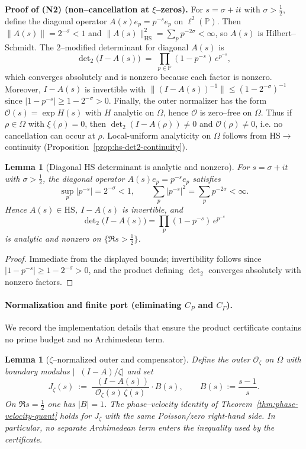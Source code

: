 \documentclass[11pt]{article}
\newtheorem{lemma}[theorem]{Lemma}
\theoremstyle{definition}
\theoremstyle{remark}
\DeclareMathOperator{\dettwo}{det_2}
\begin{document}
\medskip
\noindent\textbf{Proof of (N2) (non--cancellation at $\xi$--zeros).}
For $s=\sigma+it$ with $\sigma>\tfrac12$, define the diagonal operator $A(s)e_p=p^{-s}e_p$ on $\ell^2(\mathbb P)$. Then $\|A(s)\|=2^{-\sigma}<1$ and $\|A(s)\|_{\mathrm{HS}}^2=\sum_{p}p^{-2\sigma}<\infty$, so $A(s)$ is Hilbert--Schmidt. The 2--modified determinant for diagonal $A(s)$ is
\[
\det\nolimits_2\!\big(I-A(s)\big)\;=\;\prod_{p\in\mathbb P}(1-p^{-s})\,e^{p^{-s}},
\]
which converges absolutely and is nonzero because each factor is nonzero. Moreover, $I-A(s)$ is invertible with $\|(I-A(s))^{-1}\|\le (1-2^{-\sigma})^{-1}$ since $|1-p^{-s}|\ge 1-2^{-\sigma}>0$. Finally, the outer normalizer has the form $\mathcal O(s)=\exp H(s)$ with $H$ analytic on $\Omega$, hence $\mathcal O$ is zero--free on $\Omega$. Thus if $\rho\in\Omega$ with $\xi(\rho)=0$, then $\det_2(I-A(\rho))\neq0$ and $\mathcal O(\rho)\neq0$, i.e. no cancellation can occur at $\rho$. Local-uniform analyticity on $\Omega$ follows from HS$\to\dettwo$ continuity (Proposition~\ref{prop:hs-det2-continuity}).
\begin{lemma}[Diagonal HS determinant is analytic and nonzero]\label{lem:hs-diagonal}
For $s=\sigma+it$ with $\sigma>\tfrac12$, the diagonal operator $A(s)e_p=p^{-s}e_p$ satisfies
\[
\sup_{p}|p^{-s}|=2^{-\sigma}<1,\qquad \sum_{p}|p^{-s}|^2=\sum_{p}p^{-2\sigma}<\infty.
\]
Hence $A(s)\in\mathrm{HS}$, $I-A(s)$ is invertible, and
\[
\det\nolimits_2\big(I-A(s)\big)=\prod_{p}(1-p^{-s})\,e^{p^{-s}}
\]
is analytic and nonzero on $\{\Re s>\tfrac12\}$.
\end{lemma}
\begin{proof}
Immediate from the displayed bounds; invertibility follows since $|1-p^{-s}|\ge 1-2^{-\sigma}>0$, and the product defining $\det_2$ converges absolutely with nonzero factors.
\end{proof}
\paragraph{Normalization and finite port (eliminating $C_P$ and $C_\Gamma$).}
We record the implementation details that ensure the product certificate contains no prime budget and no Archimedean term.

\begin{lemma}[\(\zeta\)–normalized outer and compensator]\label{lem:zeta-normalization}
Define the outer $\mathcal O_\zeta$ on $\Omega$ with boundary modulus $\big|\dettwo(I-A)/\zeta\big|$ and set
\[ J_\zeta(s)\ :=\ \frac{\dettwo(I-A(s))}{\mathcal O_\zeta(s)\,\zeta(s)}\cdot B(s),\qquad B(s):=\frac{s-1}{s}. \]
On $\Re s=\tfrac12$ one has $|B|=1$. The phase–velocity identity of Theorem~\ref{thm:phase-velocity-quant} holds for $J_\zeta$ with the same Poisson/zero right-hand side. In particular, no separate Archimedean term enters the inequality used by the certificate.
\end{lemma}
\end{document}

